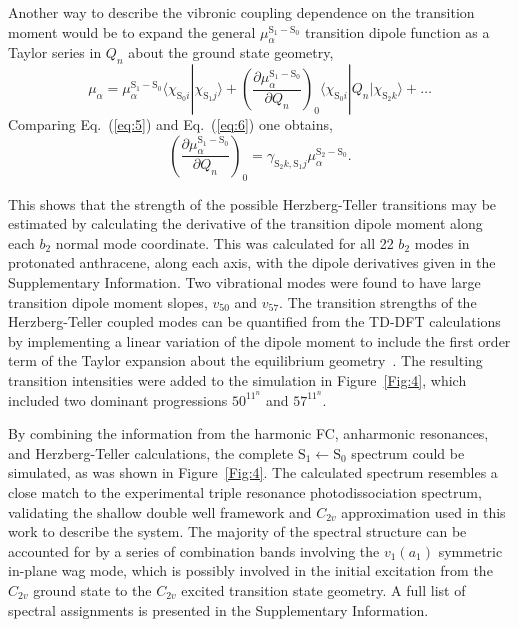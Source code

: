\documentclass[journal=jpcafh,manuscript=article,layout=onecolumn, 12pt]{achemso}
\begin{document}
Another way to describe the vibronic coupling dependence on the transition moment would be to expand the general $\mu_{\alpha}^{\text{S}_1-\text{S}_0}$ transition dipole function as a Taylor series in $Q_n$ about the ground state geometry,
\begin{equation}
\mu_{\alpha} = \mu_{\alpha}^{\text{S}_1-\text{S}_0}\langle\chi_{\text{S}_0i}|\chi_{\text{S}_1j}\rangle + \left(\frac{\partial\mu_{\alpha}^{\text{S}_1-\text{S}_0}}{\partial Q_n}\right)_0 \langle\chi_{\text{S}_0i}|Q_n|\chi_{\text{S}_2k}\rangle + \dots 
\label{eq:6}
\end{equation} 
Comparing Eq.~(\ref{eq:5}) and Eq.~(\ref{eq:6}) one obtains,
\begin{equation}
\left(\frac{\partial\mu_{\alpha}^{\text{S}_1-\text{S}_0}}{\partial Q_n}\right)_0 = \gamma_{\text{S}_2k,\text{S}_1j}\mu_{\alpha}^{\text{S}_2-\text{S}_0}.
\label{eq:7}
\end{equation}

This shows that the strength of the possible Herzberg-Teller transitions may be estimated by calculating the derivative of the transition dipole moment along each $b_2$ normal mode coordinate. This was calculated for all 22 $b_2$ modes in protonated anthracene, along each axis, with the dipole derivatives given in the Supplementary Information. Two vibrational modes were found to have large transition dipole moment slopes, $v_{50}$ and $v_{57}$. The transition strengths of the Herzberg-Teller coupled modes can be quantified from the TD-DFT calculations by implementing a linear variation of the dipole moment to include the first order term of the Taylor expansion about the equilibrium geometry~\cite{bai13}. The resulting transition intensities were added to the simulation in Figure~\ref{Fig:4}, which included two dominant progressions $50^11^n$ and $57^11^n$. 


By combining the information from the harmonic FC, anharmonic resonances, and Herzberg-Teller calculations, the complete $\text{S}_1\leftarrow \text{S}_0$ spectrum could be simulated, as was shown in Figure~\ref{Fig:4}. The calculated spectrum resembles a close match to the experimental triple resonance photodissociation spectrum, validating the shallow double well framework and $C_{2v}$ approximation used in this work to describe the system. The majority of the spectral structure can be accounted for by a series of combination bands involving the $v_1(a_1)$ symmetric in-plane wag mode, which is possibly involved in the initial excitation from the $C_{2v}$ ground state to the $C_{2v}$ excited transition state geometry. A full list of spectral assignments is presented in the Supplementary Information.
\end{document}
